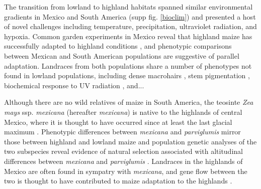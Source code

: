 The transition from lowland to highland habitats spanned similar environmental gradients in Mexico and South America (supp fig. \ref{bioclim}) and presented a host of novel challenges including  temperature, precipitation, ultraviolet radiation, and hypoxia. 
%
%
%
%
%
%
Common garden experiments in Mexico reveal that highland maize has successfully adapted to highland conditions \cite[]{Mercer2008}, and phenotypic comparisons between Mexican and South American populations are suggestive of parallel adaptation.  Landraces from both populations share a number of phenotypes not found in lowland populations, including dense macrohairs \cite[]{CITE}, stem pigmentation \cite[]{CITE}, biochemical response to UV radiation \cite[]{Casati2005}, and...
%
%

Although there are no wild relatives of maize in South America, the teosinte \emph{Zea mays} ssp. \emph{mexicana} (hereafter \emph{mexicana}) is native to the highlands of central Mexico, where it is thought to have occurred since at least the last glacial maximum \cite[]{Ross-Ibarra 2009, Hufford_niche}. Phenotypic differences between \emph{mexicana} and \emph{parviglumis} mirror those between highland and lowland maize \cite[]{Lauter_2004_15342532} and population genetic analyses of the two subspecies reveal evidence of natural selection associated with altitudinal differences between \emph{mexicana} and \emph{parviglumis} \cite[]{Pyhajarvi2013}.  Landraces in the highlands of Mexico are often found in sympatry with  \emph{mexicana}, and gene flow between the two is thought to have contributed to maize adaptation to the highlands \cite[]{Profford_2013}.


